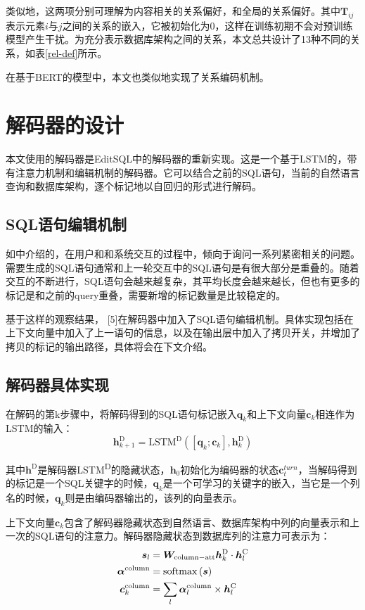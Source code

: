 类似地，这两项分别可理解为内容相关的关系偏好，和全局的关系偏好。其中$\bm{T}_{ij}$表示元素$i$与$j$之间的关系的嵌入，它被初始化为0，这样在训练初期不会对预训练模型产生干扰。为充分表示数据库架构之间的关系，本文总共设计了13种不同的关系，如表\ref{rel-def}所示。

在基于BERT的模型中，本文也类似地实现了关系编码机制。

\section{解码器的设计}

本文使用的解码器是EditSQL\cite{edit19}中的解码器的重新实现。这是一个基于LSTM的，带有注意力机制和编辑机制的解码器。它可以结合之前的SQL语句，当前的自然语言查询和数据库架构，逐个标记地以自回归的形式进行解码。

\subsection{SQL语句编辑机制}

如\citet{edit19}中介绍的，在用户和和系统交互的过程中，倾向于询问一系列紧密相关的问题。需要生成的SQL语句通常和上一轮交互中的SQL语句是有很大部分是重叠的。随着交互的不断进行，SQL语句会越来越复杂，其平均长度会越来越长，但也有更多的标记是和之前的query重叠，需要新增的标记数量是比较稳定的。

基于这样的观察结果， [5]在解码器中加入了SQL语句编辑机制。具体实现包括在上下文向量中加入了上一语句的信息，以及在输出层中加入了拷贝开关，并增加了拷贝的标记的输出路径，具体将会在下文介绍。

\subsection{解码器具体实现}

在解码的第k步骤中，将解码得到的SQL语句标记嵌入$\bm{q}_k$和上下文向量$\bm{c}_k$相连作为LSTM的输入：
\begin{equation}
    \bm{h}_{k+1}^\mathrm{D}=\mathrm{LSTM^D}\left(\left[\bm{q}_k;\bm{c}_k\right],\bm{h}_k^\mathrm{D}\right)
\end{equation}

其中$\bm{h}^\mathrm{D}$是解码器LSTM\textsuperscript{D}的隐藏状态，$\bm{h}_0$初始化为编码器的状态$\bm{c}_t^{turn}$，当解码得到的标记是一个SQL关键字的时候，$\bm{q}_k$是一个可学习的关键字的嵌入，当它是一个列名的时候，$\bm{q}_k$则是由编码器输出的，该列的向量表示。

上下文向量$\bm{c}_k$包含了解码器隐藏状态到自然语言、数据库架构中列的向量表示和上一次的SQL语句的注意力。解码器隐藏状态到数据库列的注意力可表示为：
\begin{align}
    \bm{s}_l&=\bm{W}_\mathrm{column-att}\bm{h}_k^\mathrm{D}\cdot\bm{h}_l^\mathrm{C}\\
    \bm{\alpha}^\mathrm{column}&=\mathrm{softmax}\left(\bm{s}\right)\\
    \bm{c}_k^\mathrm{column}&=\sum_{l}{\bm{\alpha}_l^\mathrm{column}\times\bm{h}_l^\mathrm{C}}
\end{align}

